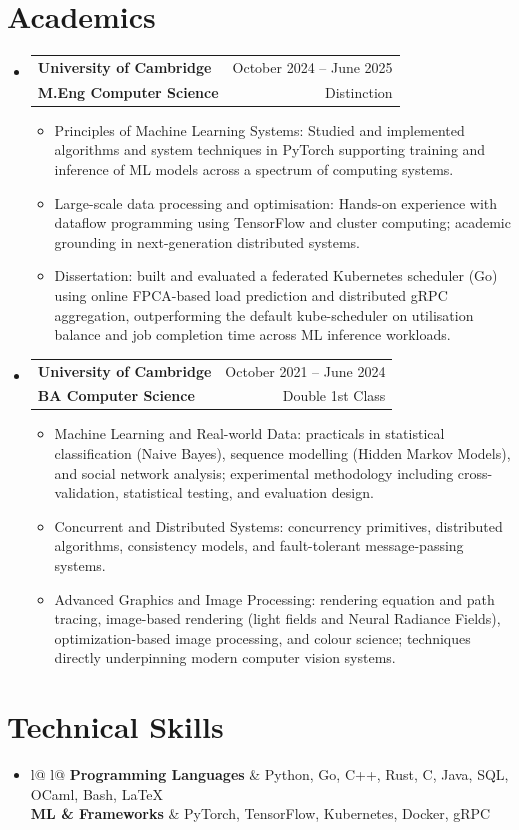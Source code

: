 \documentclass[a4paper,10pt]{article}
\makeatletter
\newcommand{\resumeItem}[2]{
  \item[--]
    \textbf{#1}{#2 \vspace{-2pt}}
  }
\newcommand{\resumeSubheading}[4]{
  \vspace{-1pt}\item
    \begin{tabular*}{0.97\textwidth}{l@{\extracolsep{\fill}}r}
      \textbf{#1} & \small{#2} \\
      \textbf{#3} &  \small{#4} \\
    \end{tabular*}\vspace{-5pt}
}
\newcommand{\resumeSubHeadingListStart}{\begin{itemize}[leftmargin=*]}
\newcommand{\resumeSubHeadingListEnd}{\end{itemize}\vspace{-0.4cm}}
\newcommand{\resumeItemListStart}{\begin{itemize}
    [labelsep=1ex, itemindent=0em, leftmargin=1em
    ]}
\newcommand{\resumeItemListEnd}{\end{itemize}\vspace{-5pt}}
\makeatother
\begin{document}
\section{Academics}
 {\renewcommand\labelitemi{}

  \resumeSubHeadingListStart

  \resumeSubheading
  {University of Cambridge}{October 2024 -- June 2025}
  {M.Eng Computer Science}{Distinction}
  \resumeItemListStart
  \resumeItem{}{Principles of Machine Learning Systems: Studied and
	  implemented algorithms and system techniques in PyTorch supporting
	  training and inference of ML models across a spectrum of computing systems.}
  \resumeItem{}{Large-scale data processing and optimisation: Hands-on
	  experience with dataflow programming using TensorFlow and cluster
	  computing; academic grounding in next-generation distributed systems.}
  \resumeItem{}{Dissertation: built and evaluated a federated Kubernetes
	  scheduler (Go) using online FPCA-based load prediction and distributed
	  gRPC aggregation, outperforming the default kube-scheduler on
	  utilisation balance and job completion time across ML inference workloads.}
  \resumeItemListEnd

  \resumeSubheading
  {University of Cambridge}{October 2021 -- June 2024}
  {BA Computer Science}{Double 1st Class}
  \resumeItemListStart
  \resumeItem{}{Machine Learning and Real-world Data: practicals in
	  statistical classification (Naive Bayes), sequence modelling (Hidden
	  Markov Models), and social network analysis; experimental methodology
	  including cross-validation, statistical testing, and evaluation design.}
  \resumeItem{}{Concurrent and Distributed Systems: concurrency primitives,
	  distributed algorithms, consistency models, and fault-tolerant
	  message-passing systems.}
  \resumeItem{}{Advanced Graphics and Image Processing: rendering equation
	  and path tracing, image-based rendering (light fields and Neural
	  Radiance Fields), optimization-based image processing, and colour
	  science; techniques directly underpinning modern computer vision
	  systems.}
  \resumeItemListEnd

  \resumeSubHeadingListEnd

  \vspace{-0.2cm}
  \section{Technical Skills}
  \resumeSubHeadingListStart
  \item
  \begin{tabular}{l@	{} l@{\hskip 1in}}
	  \textbf{Programming Languages} & \hspace{.5cm} Python, Go, C++, Rust, C, Java, SQL, OCaml, Bash, \LaTeX  \\
	  \textbf{ML \& Frameworks}      & \hspace{.5cm} PyTorch, TensorFlow, Kubernetes, Docker, gRPC
  \end{tabular}
  \resumeSubHeadingListEnd

}
\end{document}
